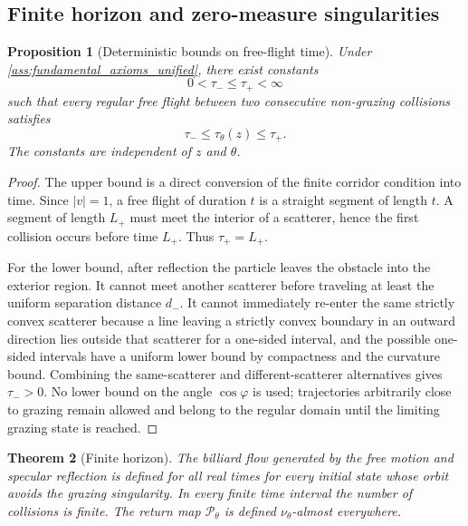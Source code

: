 \documentclass[12pt, letterpaper]{amsart}
\newcommand{\Pcal}{\mathcal{P}}
\theoremstyle{plain}
\newtheorem{theorem}{Theorem}[section]
\newtheorem{proposition}[theorem]{Proposition}
\theoremstyle{definition}
\theoremstyle{remark}
\begin{document}
\subsection{Finite horizon and zero-measure singularities}

\begin{proposition}[Deterministic bounds on free-flight time]
\label{prop:finite_horizon_bounds}
Under \cref{ass:fundamental_axioms_unified}, there exist constants
\begin{equation}
    0<\tau_-\le \tau_+<\infty
\end{equation}
such that every regular free flight between two consecutive non-grazing collisions satisfies
\begin{equation}
    \tau_-\le \tau_\theta(z)\le \tau_+ .
\end{equation}
The constants are independent of $z$ and $\theta$.
\end{proposition}

\begin{proof}
The upper bound is a direct conversion of the finite corridor condition into time.  Since $|v|=1$, a free flight of duration $t$ is a straight segment of length $t$.  A segment of length $L_+$ must meet the interior of a scatterer, hence the first collision occurs before time $L_+$.  Thus $\tau_+=L_+$.

For the lower bound, after reflection the particle leaves the obstacle into the exterior region.  It cannot meet another scatterer before traveling at least the uniform separation distance $d_-$.  It cannot immediately re-enter the same strictly convex scatterer because a line leaving a strictly convex boundary in an outward direction lies outside that scatterer for a one-sided interval, and the possible one-sided intervals have a uniform lower bound by compactness and the curvature bound.  Combining the same-scatterer and different-scatterer alternatives gives $\tau_->0$.  No lower bound on the angle $\cos\varphi$ is used; trajectories arbitrarily close to grazing remain allowed and belong to the regular domain until the limiting grazing state is reached.
\end{proof}

\begin{theorem}[Finite horizon]
\label{thm:finite_horizon}
The billiard flow generated by the free motion and specular reflection is defined for all real times for every initial state whose orbit avoids the grazing singularity.  In every finite time interval the number of collisions is finite.  The return map $\Pcal_\theta$ is defined $\nu_\theta$-almost everywhere.
\end{theorem}
\end{document}
